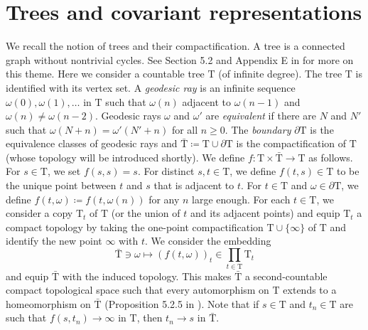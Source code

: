 \documentclass[12pt,nosumlimits,nonamelimits]{amsart}
\theoremstyle{remark}
\theoremstyle{definition}
\newcommand{\Tree}{\mathrm{T}}
\begin{document}
\section{Trees and covariant representations}\label{sec:repn}
%
We recall the notion of trees and their compactification. 
A tree is a connected graph without nontrivial cycles. 
See Section 5.2 and Appendix E in \cite{bo} for more 
on this theme. 
Here we consider a countable tree $\Tree$ (of infinite degree).
The tree $\Tree$ is identified with its vertex set. 
A \emph{geodesic ray} is an infinite sequence 
$\omega(0),\omega(1),\ldots$ in $\Tree$ 
such that $\omega(n)$ adjacent to $\omega(n-1)$ 
and $\omega(n)\neq \omega(n-2)$. 
Geodesic rays $\omega$ and $\omega'$ are \emph{equivalent} 
if there are $N$ and $N'$ such that 
$\omega(N+n)=\omega'(N'+n)$ for all $n\geq0$.
The \emph{boundary} $\partial\Tree$ is the equivalence classes 
of geodesic rays and 
$\bar{\Tree} \coloneq \Tree \cup \partial\Tree$ 
is the compactification of $\Tree$ (whose topology 
will be introduced shortly). 
We define $f\colon\Tree\times\bar{\Tree}\to\Tree$ as follows. 
For $s\in\Tree$, we set $f(s,s)=s$. 
For distinct $s,t\in\Tree$, we define $f(t,s)\in\Tree$ 
to be the unique point between $t$ and $s$ 
that is adjacent to $t$. 
For $t\in\Tree$ and $\omega\in\partial\Tree$, 
we define $f(t,\omega) \coloneq f(t,\omega(n))$ for any $n$ large enough. 
For each $t\in\Tree$, we consider a copy $\Tree_t$ 
of $\Tree$ (or the union of $t$ and its adjacent points) 
and equip $\Tree_t$ a compact topology by taking 
the one-point compactification $\Tree\cup\{\infty\}$ 
of $\Tree$ and identify the new point $\infty$ with $t$. 
We consider the embedding 
\[
\bar{\Tree} \ni \omega \mapsto 
(f(t,\omega))_t \in \prod_{t\in\Tree}\Tree_t
\]
and equip $\bar{\Tree}$ with the induced topology. 
This makes $\bar{\Tree}$ a second-countable 
compact topological space such that every automorphism 
on $\Tree$ extends to a homeomorphism on $\bar{\Tree}$ 
(Proposition 5.2.5 in \cite{bo}). 
Note that if $s\in\Tree$ and $t_n\in\Tree$ are such that 
$f(s,t_n)\to\infty$ in $\Tree$, then $t_n\to s$ in $\bar{\Tree}$. 
\end{document}
